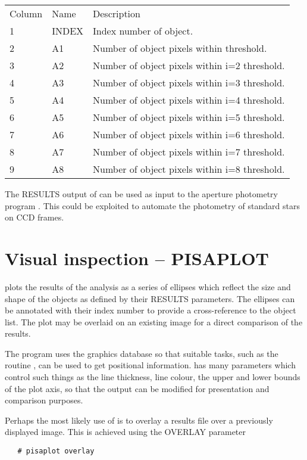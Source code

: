 \begin{center}
\begin{tabular}{lll}
Column & Name  & Description \\
 1 & INDEX & Index number of object.\\
 2 & A1 & Number of object pixels within threshold.\\
 3 & A2 & Number of object pixels within i=2 threshold.\\
 4 & A3 & Number of object pixels within i=3 threshold.\\
 5 & A4 & Number of object pixels within i=4 threshold.\\
 6 & A5 & Number of object pixels within i=5 threshold.\\
 7 & A6 & Number of object pixels within i=6 threshold.\\
 8 & A7 & Number of object pixels within i=7 threshold.\\
 9 & A8 & Number of object pixels within i=8 threshold.\\
\end{tabular}
\end{center}

The RESULTS output of  can be used as input to the
aperture photometry program . This could be
exploited to automate the photometry of standard stars on CCD frames.

\section{Visual inspection -- PISAPLOT}

 plots the results of the  analysis as a
series of ellipses which reflect the size and shape of the objects as
defined by their RESULTS parameters. The ellipses can be annotated
with their index number to provide a cross-reference to the object
list. The plot may be overlaid on an existing image for a direct
comparison of the results.

The program uses  the graphics database so that
suitable tasks, such as the  routine
, can be used to get positional
information.  has many parameters which control such things as
the line thickness, line colour, the upper and lower bounds of the
plot axis, so that the output can be modified for presentation and
comparison purposes.

Perhaps the most likely use of  is to overlay a results
file over a previously displayed image. This is achieved using the
OVERLAY parameter
\begin{verbatim}
   # pisaplot overlay
\end{verbatim}

